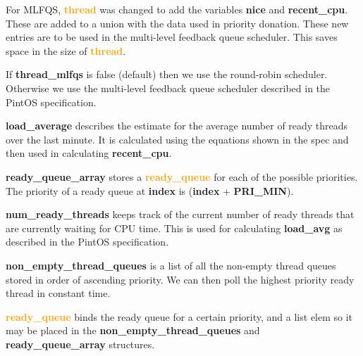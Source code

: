 \documentclass{report}
\newcommand{\file}[1]{\textcolor{YellowGreen}{\textbf{#1}}}
\newcommand{\struct}[1]{\textcolor{orange}{\textbf{#1}}}
\newcommand{\var}[1]{\textcolor{RoyalPurple}{\textbf{#1}}}
\newcommand{\const}[1]{\textcolor{BrickRed}{\textbf{#1}}}
\newcommand{\pintoscode}[4]{}
\begin{document}
                \pintoscode{91}{123}{thread.h}{thread.h}
                For MLFQS, \struct{thread} was changed to add the variables \var{nice} and \var{recent\_cpu}. These are added to a union 
                with the data used in priority donation. These new entries are to be used in the multi-level feedback queue 
                scheduler. This saves space in the size of \struct{thread}.

                \pintoscode{137}{137}{thread.h}{thread.h}
                If \var{thread\_mlfqs} is false (default) then we use the round-robin scheduler. Otherwise we 
                use the multi-level feedback queue scheduler described in the PintOS specification.
               
                \pintoscode{72}{72}{thread.c}{thread.c}
                \var{load\_average} describes the estimate for the average number of ready threads over the last minute. 
                It is calculated using the equations shown in the spec and then used in calculating \var{recent\_cpu}.
                
                \pintoscode{68}{69}{thread.c}{thread.c}
                \var{ready\_queue\_array} stores a \struct{ready\_queue} for each of the possible priorities. The priority 
                of a ready queue at \var{index} is (\var{index} + \const{PRI\_MIN}).
                
                \pintoscode{62}{63}{thread.c}{thread.c}
                \var{num\_ready\_threads} keeps track of the current number of ready threads that are currently waiting for CPU time. 
                This is used for calculating \var{load\_avg} as described in the PintOS specification.
                
                \pintoscode{65}{66}{thread.c}{thread.c}
                \var{non\_empty\_thread\_queues} is a list of all the non-empty thread queues stored in order of ascending 
                priority. We can then poll the highest priority ready thread in constant time.

                \pintoscode{125}{131}{thread.h}{thread.h}
                \struct{ready\_queue} binds the ready queue for a certain priority, and a list elem so it may be placed 
                in the \var{non\_empty\_thread\_queues} and \var{ready\_queue\_array} structures.
                
\end{document}
